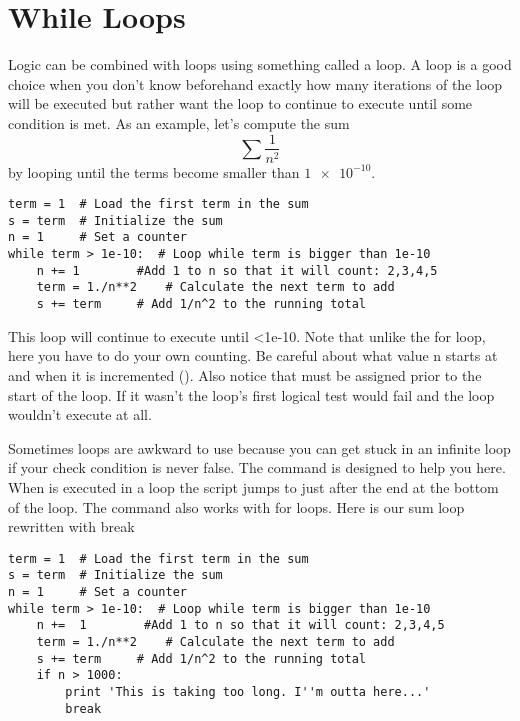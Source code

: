 \section{While Loops}
Logic can be combined with loops using something called a
 loop.  A  loop is a good choice when you
don't know beforehand exactly how many iterations of the loop will be
executed but rather want the loop to continue to execute until some
condition is met.  As an example, let's compute the sum
\begin{equation}\label{eq:sum}
\sum \frac{1}{n^2}
\end{equation}
by looping until the terms become smaller than $\num{1e-10}$.
\begin{Verbatim}
term = 1  # Load the first term in the sum
s = term  # Initialize the sum
n = 1     # Set a counter
while term > 1e-10:  # Loop while term is bigger than 1e-10
    n += 1        #Add 1 to n so that it will count: 2,3,4,5
    term = 1./n**2    # Calculate the next term to add
    s += term     # Add 1/n^2 to the running total
\end{Verbatim}
This loop will continue to execute until <1e-10. Note
that unlike the for loop, here you have to do your own counting. Be
careful about what value n starts at and when it is incremented
(). Also notice that  must be assigned
prior to the start of the loop.  If it wasn't the loop's first logical
test would fail and the loop wouldn't execute at all.

Sometimes  loops are awkward to use because you can get
stuck in an infinite loop if your check condition is never false. The
 command is designed to help you here. When
 is executed in a loop the script jumps to just after
the end at the bottom of the loop. The  command also
works with for loops. Here is our sum loop rewritten with break
\begin{Verbatim}
term = 1  # Load the first term in the sum
s = term  # Initialize the sum
n = 1     # Set a counter
while term > 1e-10:  # Loop while term is bigger than 1e-10
    n +=  1        #Add 1 to n so that it will count: 2,3,4,5
    term = 1./n**2    # Calculate the next term to add
    s += term     # Add 1/n^2 to the running total
    if n > 1000:
        print 'This is taking too long. I''m outta here...'
        break
\end{Verbatim}

